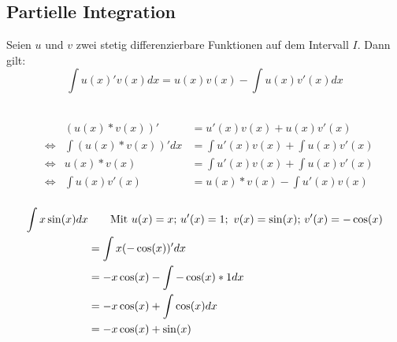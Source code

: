 \subsection{Partielle Integration}
\begin{Theorem}
  Seien $u$ und $v$ zwei stetig differenzierbare Funktionen auf dem Intervall $I$. Dann gilt:
  $$\int u(x)'v(x) dx= u(x)v(x) - \int u(x)v'(x) dx$$
\end{Theorem}
\begin{Beweis}\\
\begin{align*}
  &&(u(x)*v(x))' &= u'(x)v(x)+u(x)v'(x)\\
  &\Leftrightarrow & \int (u(x)*v(x))' dx &= \int u'(x)v(x)+\int u(x)v'(x)\\
  &\Leftrightarrow & u(x)*v(x) &= \int u'(x)v(x)+\int u(x)v'(x)\\
  &\Leftrightarrow & \int u(x)v'(x) &= u(x)*v(x)- \int u'(x)v(x)\\
\end{align*}
\end{Beweis}
\begin{Beispiel}
  \begin{align*}
  \int x\sin(x) dx & \text{\qquad Mit $u(x)=x$; $u'(x)=1$; \,$v(x)=\sin(x)$; $v'(x)=-\cos(x)$}\\
  &= \int x(-\cos(x))' dx\\
  &= -x\cos(x) - \int-\cos(x)*1 dx\\
  &= -x\cos(x) + \int\cos(x) dx\\
  &= -x\cos(x) + \sin(x)
\end{align*}
\end{Beispiel}

